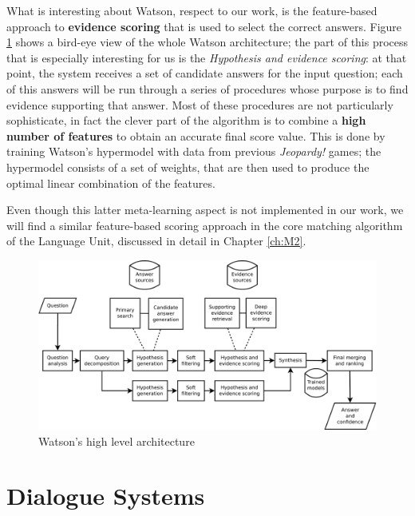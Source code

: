 What is interesting about Watson, respect to our work, is the feature-based approach to \textbf{evidence scoring} that is used to select the correct answers. Figure \ref{ch:rw:ml:watson} \citep{journals/aim/FerrucciBCFGKLMNPSW10} shows a bird-eye view of the whole Watson architecture; the part of this process that is especially interesting for us is the \textit{Hypothesis and evidence scoring}: at that point, the system receives a set of candidate answers for the input question; each of this answers will be run through a series of procedures whose purpose is to find evidence supporting that answer. Most of these procedures are not particularly sophisticate, in fact the clever part of the algorithm is to combine a \textbf{high number of features} to obtain an accurate final score value. This is done by training Watson's hypermodel with data from previous \textit{Jeopardy!} games; the hypermodel consists of a set of weights, that are then used to produce the optimal linear combination of the features.

Even though this latter meta-learning aspect is not implemented in our work, we will find a similar feature-based scoring approach in the core matching algorithm of the Language Unit, discussed in detail in Chapter \ref{ch:M2}.

\begin{figure}
	\centering
	\includegraphics[width=12cm]{Pictures/DeepQA.pdf}
	\caption{Watson's high level architecture}
	\label{ch:rw:ml:watson}
\end{figure}




\section{Dialogue Systems}

